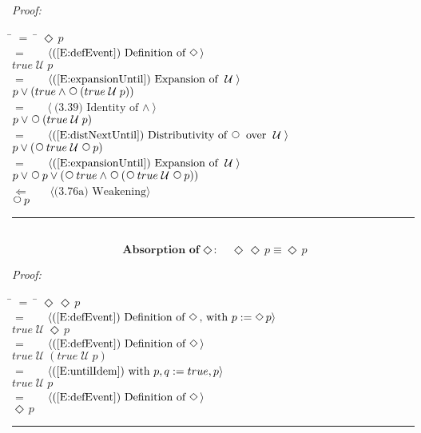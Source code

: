 \documentclass[fleqn, leqno]{article}
\newcommand{\lgap}{2pt} %
\newcommand{\mymathindent}{24pt} %
\newcommand{\Until}{\;\mathcal{U}\;}
\newcommand{\Next}{\;\,\text{\raisebox{3.5pt}{\circle{6}}}}
\newcommand{\Event}{\Diamond\,}
\newcommand{\myqed}{\hfill\rule[-.23ex]{1.2ex}{2.0ex}}
\newcommand{\Gll} {\langle} %
\newcommand{\Ggg} {\rangle} %
\newcommand{\Hint}[1] {\ \ \ $\Gll \mbox{#1} \Ggg$ } %
\begin{document}
\emph{Proof:}
\begin{tabbing}
\hspace{\mymathindent} \= $= \;$ \= \kill
\> \> $\Event p$\\[\lgap]
\> $=$ \> \Hint{(\ref{E:defEvent}) Definition of $\Event$}\\[\lgap]
\> \> $true \Until p$\\[\lgap]
\> $=$ \> \Hint{(\ref{E:expansionUntil}) Expansion of $\Until$}\\[\lgap]
\> \> $p \lor (true \land \Next(true \Until p))$\\[\lgap]
\> $=$ \> \Hint{(3.39) Identity of $\land$}\\[\lgap]
\> \> $p \lor \Next(true \Until p)$\\[\lgap]
\> $=$ \> \Hint{(\ref{E:distNextUntil}) Distributivity of $\Next$ over $\Until$}\\[\lgap]
\> \> $p \lor (\Next true \Until \Next p)$\\[\lgap]
\> $=$ \> \Hint{(\ref{E:expansionUntil}) Expansion of $\Until$}\\[\lgap]
\> \> $p \lor \Next p \lor (\Next true \land \Next(\Next true \Until \Next p))$\\[\lgap]
\> $\Leftarrow$ \> \Hint{(3.76a) Weakening}\\[\lgap]
\> \> $\Next p$\\[\lgap]
\end{tabbing}
\myqed\\[\lgap]


\begin{equation}\label{E:IdemEvent}
\textbf{Absorption of $\Event$:}\quad \Event\Event p \equiv \Event p
\end{equation}

\emph{Proof:}
\begin{tabbing}
\hspace{\mymathindent} \= $= \;$ \= \kill
\> \> $\Event\Event p$\\[\lgap]
\> $=$ \> \Hint{(\ref{E:defEvent}) Definition of $\Event$, with $p := \Event p$}\\[\lgap]
\> \> $true \Until \Event p$\\[\lgap]
\> $=$ \> \Hint{(\ref{E:defEvent}) Definition of $\Event$}\\[\lgap]
\> \> $true \Until (true \Until p)$\\[\lgap]
\> $=$ \> \Hint{(\ref{E:untilIdem}) with $p,q := true,p$}\\[\lgap]
\> \> $true \Until p$\\[\lgap]
\> $=$ \> \Hint{(\ref{E:defEvent}) Definition of $\Event$}\\[\lgap]
\> \> $\Event p$\\[\lgap]
\end{tabbing}
\myqed\\[\lgap]
\end{document}
